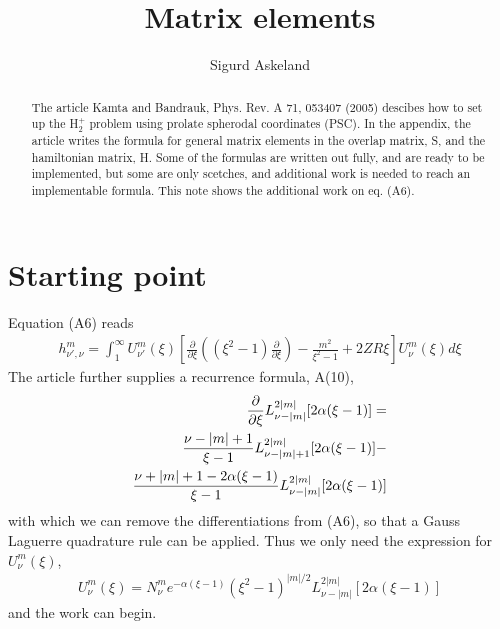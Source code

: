 \documentclass[13pt,a4paper]{article}
\title{Matrix elements}
\author{Sigurd Askeland}
\begin{document}
%
\maketitle

\begin{abstract}
    The article Kamta and Bandrauk, Phys. Rev. A 71, 053407 (2005) descibes how to
    set up the H$_2^+$ problem using prolate spherodal coordinates (PSC). In the
    appendix, the article writes the formula for general matrix elements in the
    overlap matrix, S, and the hamiltonian matrix, H. Some of the formulas are
    written out fully, and are ready to be implemented, but some are only scetches,
    and additional work is needed to reach an implementable formula. This note shows
    the additional work on eq. (A6).
\end{abstract}
    
\section{Starting point}
    Equation (A6) reads
    \begin{align}
	h_{\nu',\nu}^{m} = \int_1^{\infty} U_{\nu'}^m(\xi)
	\left[
	    \frac{\partial}{\partial \xi}  
	    \left(
		(\xi^2 - 1)\frac{\partial}{\partial \xi}	
	    \right)
	    - \frac{m^2}{\xi^2 - 1} + 2ZR\xi
	\right] U_{\nu}^m(\xi)d\xi
	\label{eq:h}
    \end{align}
    The article further supplies a recurrence formula, A(10),
    \begin{align}
	\frac{\partial}{\partial \xi}L_{\nu - |m|}^{2|m|}[2\alpha(\xi - 1)] =
	\notag \\ \frac{\nu - |m| + 1}{\xi - 1}L_{\nu - |m| +
	\label{eq:rec}
	1}^{2|m|}[2\alpha(\xi - 1)]- \\ \notag \frac{\nu + |m| + 1 - 2\alpha(\xi
	- 1)}{\xi - 1}L_{\nu - |m|}^{2|m|}[2\alpha(\xi - 1)]
    \end{align}
    with which we can remove the differentiations from (A6), so that a Gauss
    Laguerre quadrature rule can be applied. Thus we only need the expression
    for $U_{\nu}^{m}(\xi)$,
    \begin{align}
	U_{\nu}^{m}(\xi) = N_{\nu}^m e^{-\alpha(\xi - 1)}(\xi^2 - 1)^{|m|/2}
	L_{\nu - |m|}^{2|m|}[2\alpha(\xi - 1)]
	\label{eq:U}
    \end{align}
    and the work can begin.
\end{document}
